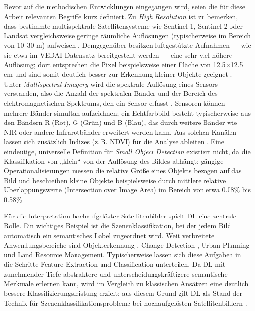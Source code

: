 Bevor auf die methodischen Entwicklungen eingegangen wird, seien die für diese Arbeit relevanten Begriffe kurz definiert. Zu \emph{High Resolution} ist zu bemerken, dass bestimmte multispektrale Satellitensysteme wie Sentinel-1, Sentinel-2 oder Landsat vergleichsweise geringe räumliche Auflösungen (typischerweise im Bereich von 10–30 m) aufweisen \cite{Wieland2023}. Demgegenüber besitzen luftgestützte Aufnahmen — wie sie etwa im \acrshort{VEDAI}-Datensatz bereitgestellt werden — eine sehr viel höhere Auflösung; dort entsprechen die Pixel beispielsweise einer Fläche von 12.5\(\times\)12.5 cm und sind somit deutlich besser zur Erkennung kleiner Objekte geeignet \cite{Razakarivony2015}. Unter \emph{Multispectral Imagery} wird die spektrale Auflösung eines Sensors verstanden, also die Anzahl der spektralen Bänder und der Bereich des elektromagnetischen Spektrums, den ein Sensor erfasst \cite{Khan2018}. Sensoren können mehrere Bänder simultan aufzeichnen; ein Echtfarbbild besteht typischerweise aus den Bändern R (Rot), G (Grün) und B (Blau), das durch weitere Bänder wie \acrfull{NIR} oder andere Infrarotbänder erweitert werden kann. Aus solchen Kanälen lassen sich zusätzlich Indizes (z.\,B. \acrfull{NDVI}) für die Analyse ableiten \cite{Wiley2018}. Eine eindeutige, universelle Definition für \emph{Small Object Detection} existiert nicht, da die Klassifikation von „klein“ von der Auflösung des Bildes abhängt; gängige Operationalisierungen messen die relative Größe eines Objekts bezogen auf das Bild und beschreiben kleine Objekte beispielsweise durch mittlere relative Überlappungswerte (Intersection over Image Area) im Bereich von etwa 0.08\% bis 0.58\% \cite{Chen2017}.

Für die Interpretation hochaufgelöster Satellitenbilder spielt \Acrlong{DL} eine zentrale Rolle. Ein wichtiges Beispiel ist die Szenenklassifikation, bei der jedem Bild automatisch ein semantisches Label zugeordnet wird. Weit verbreitete Anwendungsbereiche sind Objekterkennung \cite{Bhagavathy2006,Cheng2016}, Change Detection \cite{Chen2006}, Urban Planning und Land Resource Management. Typischerweise lassen sich diese Aufgaben in die Schritte Feature Extraction und Classification unterteilen. Da \Acrlong{DL} mit zunehmender Tiefe abstraktere und unterscheidungskräftigere semantische Merkmale erlernen kann, wird im Vergleich zu klassischen Ansätzen eine deutlich bessere Klassifizierungsleistung erzielt; aus diesem Grund gilt \Acrlong{DL} als Stand der Technik für Szenenklassifikationsprobleme bei hochaufgelösten Satellitenbildern \cite{Zhu2017}.

